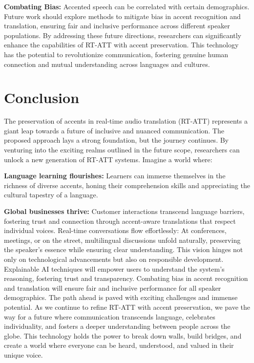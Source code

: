 \documentclass[12px, a4paper]{article}
\begin{document}
\textbf{Combating Bias:} Accented speech can be correlated with certain demographics. Future work should explore methods to mitigate bias in accent recognition and translation, ensuring fair and inclusive performance across different speaker populations.
By addressing these future directions, researchers can significantly enhance the capabilities of RT-ATT with accent preservation. This technology has the potential to revolutionize communication, fostering genuine human connection and mutual understanding across languages and cultures.

\section{Conclusion}
The preservation of accents in real-time audio translation (RT-ATT) represents a giant leap towards a future of inclusive and nuanced communication. The proposed approach lays a strong foundation, but the journey continues. By venturing into the exciting realms outlined in the future scope, researchers can unlock a new generation of RT-ATT systems. Imagine a world where:

\textbf{Language learning flourishes:} Learners can immerse themselves in the richness of diverse accents, honing their comprehension skills and appreciating the cultural tapestry of a language.

\textbf{Global businesses thrive:} Customer interactions transcend language barriers, fostering trust and connection through accent-aware translations that respect individual voices.
Real-time conversations flow effortlessly: At conferences, meetings, or on the street, multilingual discussions unfold naturally, preserving the speaker's essence while ensuring clear understanding.
This vision hinges not only on technological advancements but also on responsible development. Explainable AI techniques will empower users to understand the system's reasoning, fostering trust and transparency. Combating bias in accent recognition and translation will ensure fair and inclusive performance for all speaker demographics.
The path ahead is paved with exciting challenges and immense potential. As we continue to refine RT-ATT with accent preservation, we pave the way for a future where communication transcends language, celebrates individuality, and fosters a deeper understanding between people across the globe. This technology holds the power to break down walls, build bridges, and create a world where everyone can be heard, understood, and valued in their unique voice.
\end{document}
